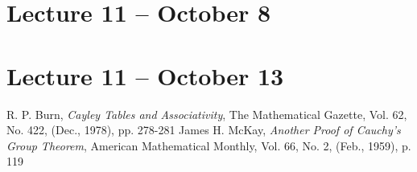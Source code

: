 \documentclass[letterpaper]{article}
\begin{document}
\section{Lecture 11 -- October 8}



\section{Lecture 11 -- October 13}

\begin{thebibliography}{7}
 R. P. Burn, \emph{Cayley Tables and Associativity},
The Mathematical Gazette, Vol. 62, No. 422, (Dec., 1978), pp. 278-281
 James H. McKay, \emph{Another Proof of Cauchy's Group Theorem}, American Mathematical Monthly, Vol. 66, No. 2, (Feb., 1959), p. 119
\end{thebibliography}
\end{document}

